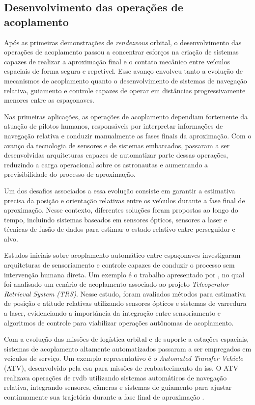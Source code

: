 \subsection{Desenvolvimento das operações de acoplamento}
\label{subsec_desenvolvimento_acoplamento}

Após as primeiras demonstrações de \textit{rendezvous} orbital, o desenvolvimento das operações de acoplamento passou a concentrar esforços na criação de sistemas capazes de realizar a aproximação final e o contato mecânico entre veículos espaciais de forma segura e repetível. 
Esse avanço envolveu tanto a evolução de mecanismos de acoplamento quanto o desenvolvimento de sistemas de navegação relativa, guiamento e controle capazes de operar em distâncias progressivamente menores entre as espaçonaves.

Nas primeiras aplicações, as operações de acoplamento dependiam fortemente da atuação de pilotos humanos, responsáveis por interpretar informações de navegação relativa e conduzir manualmente as fases finais da aproximação. 
Com o avanço da tecnologia de sensores e de sistemas embarcados, passaram a ser desenvolvidas arquiteturas capazes de automatizar parte dessas operações, reduzindo a carga operacional sobre os astronautas e aumentando a previsibilidade do processo de aproximação.

Um dos desafios associados a essa evolução consiste em garantir a estimativa precisa da posição e orientação relativas entre os veículos durante a fase final de aproximação. 
Nesse contexto, diferentes soluções foram propostas ao longo do tempo, incluindo sistemas baseados em sensores ópticos, sensores a laser e técnicas de fusão de dados para estimar o estado relativo entre perseguidor e alvo.

Estudos iniciais sobre acoplamento automático entre espaçonaves investigaram arquiteturas de sensoriamento e controle capazes de conduzir o processo sem intervenção humana direta. 
Um exemplo é o trabalho apresentado por \cite{micheal1981}, no qual foi analisado um cenário de acoplamento associado ao projeto \emph{Teleoperator Retrieval System (TRS)}. 
Nesse estudo, foram avaliados métodos para estimativa de posição e atitude relativas utilizando sensores ópticos e sistemas de varredura a laser, evidenciando a importância da integração entre sensoriamento e algoritmos de controle para viabilizar operações autônomas de acoplamento.

Com a evolução das missões de logística orbital e de suporte a estações espaciais, sistemas de acoplamento altamente automatizados passaram a ser empregados em veículos de serviço. 
Um exemplo representativo é o \emph{Automated Transfer Vehicle} (ATV), desenvolvido pela \gls{esa} para missões de reabastecimento da \gls{iss}. 
O ATV realizava operações de \gls{rvdb} utilizando sistemas automáticos de navegação relativa, integrando sensores, câmeras e sistemas de guiamento para ajustar continuamente sua trajetória durante a fase final de aproximação \cite{esaATVRendezvous}.

